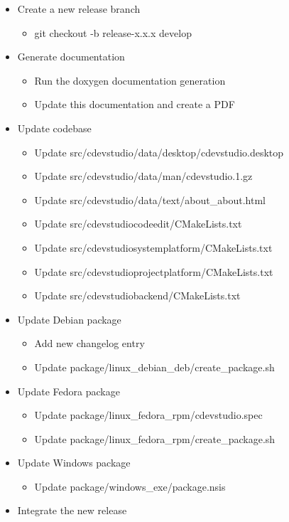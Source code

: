 \documentclass{article}
\begin{document}
\begin{itemize}
	\item Create a new release branch
	\begin{itemize}
		\item git checkout -b release-x.x.x develop
	\end{itemize}
	\item Generate documentation
	\begin{itemize}
		\item Run the doxygen documentation generation
		\item Update this documentation and create a PDF
	\end{itemize}
	\item Update codebase
	\begin{itemize}
		\item Update src/cdevstudio/data/desktop/cdevstudio.desktop
		\item Update src/cdevstudio/data/man/cdevstudio.1.gz
		\item Update src/cdevstudio/data/text/about_about.html
		\item Update src/cdevstudiocodeedit/CMakeLists.txt
		\item Update src/cdevstudiosystemplatform/CMakeLists.txt
		\item Update src/cdevstudioprojectplatform/CMakeLists.txt
		\item Update src/cdevstudiobackend/CMakeLists.txt
	\end{itemize}
	\item Update Debian package
	\begin{itemize}
		\item Add new changelog entry
		\item Update package/linux_debian_deb/create_package.sh
	\end{itemize}
	\item Update Fedora package
	\begin{itemize}
		\item Update package/linux_fedora_rpm/cdevstudio.spec
		\item Update package/linux_fedora_rpm/create_package.sh
	\end{itemize}
	\item Update Windows package
	\begin{itemize}
		\item Update package/windows_exe/package.nsis
	\end{itemize}
	\item Integrate the new release

\end{itemize}
\end{document}
